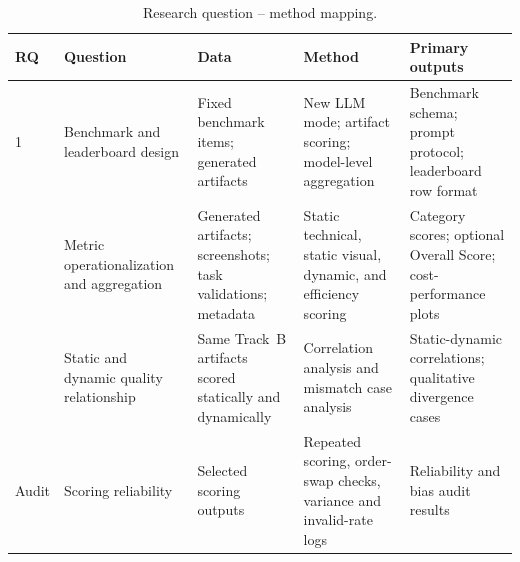 \begin{table}[t]
  \centering
  \caption{Research question -- method mapping.}
  \label{tab:rq-map}
  \small
  \setlength{\tabcolsep}{4pt}
  \begin{tabular}{p{0.7cm} p{4.0cm} p{2.4cm} p{3.0cm} p{3.9cm}}
    \toprule
    \textbf{RQ} & \textbf{Question} & \textbf{Data} & \textbf{Method}
      & \textbf{Primary outputs} \\
    \midrule
    1 & Benchmark and leaderboard design
      & Fixed benchmark items; generated artifacts
      & New LLM mode; artifact scoring; model-level aggregation
      & Benchmark schema; prompt protocol; leaderboard row format \\
    \addlinespace
    2 & Metric operationalization and aggregation
      & Generated artifacts; screenshots; task validations; metadata
      & Static technical, static visual, dynamic, and efficiency scoring
      & Category scores; optional Overall Score; cost-performance plots \\
    \addlinespace
    3 & Static and dynamic quality relationship
      & Same Track~B artifacts scored statically and dynamically
      & Correlation analysis and mismatch case analysis
      & Static-dynamic correlations; qualitative divergence cases \\
    \addlinespace
    Audit & Scoring reliability
      & Selected scoring outputs
      & Repeated scoring, order-swap checks, variance and invalid-rate logs
      & Reliability and bias audit results \\
    \bottomrule
  \end{tabular}
\end{table}
